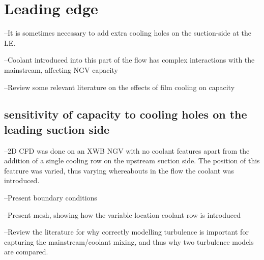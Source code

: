 \documentclass[11pt, twoside]{report}
\begin{document}
\chapter{Leading edge}




--It is sometimes necessary to add extra cooling holes on the suction-side at the LE.

--Coolant introduced into this part of the flow has complex interactions with the mainstream, affecting NGV capacity
 
--Review some relevant literature on the effects of film cooling on capacity


\section{sensitivity of capacity to cooling holes on the leading suction side}

--2D CFD was done on an XWB NGV with no coolant features apart from the addition of a single cooling row on the upstream suction side. The position of this featrure was varied, thus varying whereabouts in the flow the coolant was introduced.

--Present boundary conditions

--Present mesh, showing how the variable location coolant row is introduced

--Review the literature for why correctly modelling turbulence is important for capturing the mainstream/coolant mixing, and thus why two turbulence models are compared.
\end{document}
